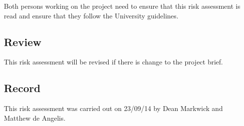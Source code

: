\documentclass[11pt, a4paper]{article}
\begin{document}
Both persons working on the project need to ensure that this risk assessment is read and ensure that they follow the University guidelines. 

\subsection*{Review}

This risk assessment will be revised if there is change to the project brief. 

\subsection*{Record}

This risk assessment was carried out on 23/09/14 by Dean Markwick and Matthew de Angelis.  

\end{document}
